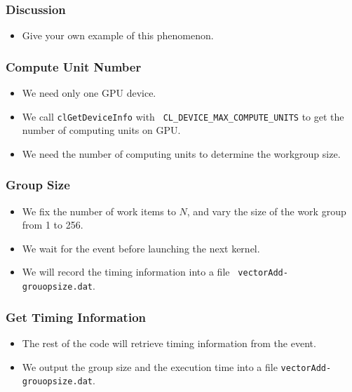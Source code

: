 \documentclass{beamer}
\begin{document}
\begin{frame}
  \frametitle{Discussion}
  \begin{itemize}
    \item Give your own example of this phenomenon.
  \end{itemize}
\end{frame}

\begin{frame}
  \frametitle{Compute Unit Number}
  \begin{itemize}
    \item We need only one GPU device.
    \item We call {\tt clGetDeviceInfo} with {\tt
      CL\_DEVICE\_MAX\_COMPUTE\_UNITS} to get the number of computing units on GPU.
    \item We need the number of computing units to determine the workgroup size.
  \end{itemize}
\end{frame}

\begin{frame}
\end{frame}


\begin{frame}
  \frametitle{Group Size}
  \begin{itemize}
    \item We fix the number of work items to $N$, and vary the size of
      the work group from 1 to 256.
    \item We wait for the event before launching the next kernel.
    \item We will record the timing information into a file {\tt
      vectorAdd-grouopsize.dat}.
  \end{itemize}
\end{frame}

\begin{frame}
\end{frame}

\begin{frame}
  \frametitle{Get Timing Information}
  \begin{itemize}
    \item The rest of the code will retrieve timing information from
      the event.
    \item We output the group size and the execution time into a file
      {\tt vectorAdd-grouopsize.dat}.
  \end{itemize}
\end{frame}
\end{document}
